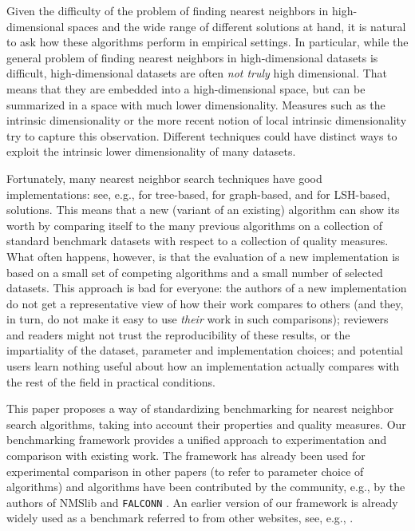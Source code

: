 Given the difficulty of the problem of finding nearest neighbors in
high-dimensional spaces and the wide range of different solutions at hand, it
is natural to ask how these algorithms perform in empirical settings. In particular,
while the general problem of finding nearest neighbors in high-dimensional datasets is difficult,
high-dimensional datasets are often \emph{not truly} high dimensional. That means that they are 
embedded into a high-dimensional space, but can be summarized in a space with much lower dimensionality. Measures
such as the intrinsic dimensionality \cite{Levina05} or the more recent notion of local intrinsic dimensionality \cite{Houle13} try to capture this observation. Different techniques could have distinct ways to exploit the intrinsic lower dimensionality of many datasets. 

Fortunately, many nearest neighbor search techniques have good implementations: see,
e.g., \cite{flann,annoy,rpforest} for tree-based, \cite{nmslib,kgraph} for
graph-based, and \cite{falconn} for LSH-based, solutions.
This means that a new (variant of an existing) algorithm can show its worth by
comparing itself to the many previous algorithms on a collection of standard
benchmark datasets with respect to a collection of quality measures.
What often happens, however, is that the evaluation of a new implementation is
based on a small set of competing algorithms and a small number of selected
datasets. This approach is bad for everyone: the authors of a new
implementation do not get a representative view of how their work compares to
others (and they, in turn, do not make it easy to use \emph{their} work in such
comparisons); reviewers and readers might not trust the reproducibility of
these results, or the impartiality of the dataset, parameter and implementation
choices; and potential users learn nothing useful about how an implementation
actually compares with the rest of the field in practical conditions.

This paper proposes a way of standardizing benchmarking for nearest neighbor
search algorithms, taking into account their properties and quality measures.
Our benchmarking framework provides a unified approach to experimentation and
comparison with existing work. The framework has already been used for
experimental comparison in other papers \cite{hnsw} (to refer to parameter
choice of algorithms) and algorithms have been contributed by the community,
e.g., by the authors of 
NMSlib \cite{nmslib} and \texttt{FALCONN} \cite{falconn}. An earlier version of our
framework is already widely used 
as a benchmark referred to from other websites, see, e.g., \cite{nmslib,falconn,annoy,rpforest,kgraph}.

